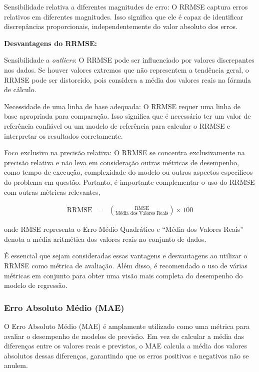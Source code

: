Sensibilidade relativa a diferentes magnitudes de erro: O RRMSE captura erros relativos em diferentes magnitudes. Isso significa que ele é capaz de identificar discrepâncias proporcionais, independentemente do valor absoluto dos erros.


\noindent\textbf{Desvantagens do RRMSE:}


Sensibilidade a \textit{outliers}: O RRMSE pode ser influenciado por valores discrepantes nos dados. Se houver valores extremos que não representem a tendência geral, o RRMSE pode ser distorcido, pois considera a média dos valores reais na fórmula de cálculo.
	
Necessidade de uma linha de base adequada: O RRMSE requer uma linha de base apropriada para comparação. Isso significa que é necessário ter um valor de referência confiável ou um modelo de referência para calcular o RRMSE e interpretar os resultados corretamente.
	
Foco exclusivo na precisão relativa: O RRMSE se concentra exclusivamente na precisão relativa e não leva em consideração outras métricas de desempenho, como tempo de execução, complexidade do modelo ou outros aspectos específicos do problema em questão. Portanto, é importante complementar o uso do RRMSE com outras métricas relevantes,





\begin{eqnarray}
	\text{RRMSE} &=& \left(\frac{\text{RMSE}}{\text{Média dos Valores Reais}}\right) \times 100 \label{eq:rrmse}
\end{eqnarray}


\noindent onde RMSE representa o Erro Médio Quadrático e ``Média dos Valores Reais'' denota a média aritmética dos valores reais no conjunto de dados.

É essencial que sejam consideradas essas vantagens e desvantagens ao utilizar o RRMSE como métrica de avaliação. Além disso, é recomendado o uso de várias métricas em conjunto para obter uma visão mais completa do desempenho do modelo de regressão.



\subsubsection{Erro Absoluto M\'edio (MAE)}

O Erro Absoluto Médio (MAE) é amplamente utilizado como uma métrica para avaliar o desempenho de modelos de previsão. Em vez de calcular a média das diferenças entre os valores reais e previstos, o MAE calcula a média dos valores absolutos dessas diferenças, garantindo que os erros positivos e negativos não se anulem.

